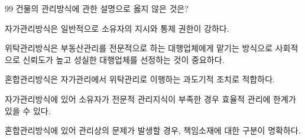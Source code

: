 \begin{question}{99}
건물의 관리방식에 관한 설명으로 옳지 않은 것은?
\begin{choices}
  \item 자가관리방식은 일반적으로 소유자의 지시와 통제 권한이 강하다.
  \item 위탁관리방식은 부동산관리를 전문적으로 하는 대행업체에게 맡기는 방식으로 사회적으로 신뢰도가 높고 성실한 대행업체를 선정하는 것이 중요하다.
  \item 혼합관리방식은 자가관리에서 위탁관리로 이행하는 과도기적 조치로 적합하다.
  \item 자가관리방식에 있어 소유자가 전문적 관리지식이 부족한 경우 효율적 관리에 한계가 있을 수 있다.
  \item 혼합관리방식에 있어 관리상의 문제가 발생할 경우, 책임소재에 대한 구분이 명확하다.
\end{choices}
\end{question}

